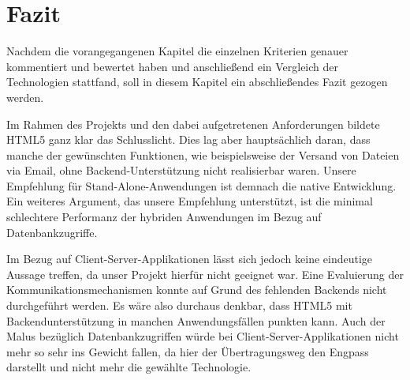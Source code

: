 \section{Fazit}
Nachdem die vorangegangenen Kapitel die einzelnen Kriterien genauer kommentiert und bewertet haben und anschließend ein Vergleich der Technologien stattfand, soll in diesem Kapitel ein abschließendes Fazit gezogen werden.

Im Rahmen des Projekts und den dabei aufgetretenen Anforderungen bildete HTML5 ganz klar das Schlusslicht. Dies lag aber hauptsächlich daran, dass manche der gewünschten Funktionen, wie beispielsweise der Versand von Dateien via Email, ohne Backend-Unterstützung nicht realisierbar waren. Unsere Empfehlung für Stand-Alone-Anwendungen ist demnach die native Entwicklung. Ein weiteres Argument, das unsere Empfehlung unterstützt, ist die minimal schlechtere Performanz der hybriden Anwendungen im Bezug auf Datenbankzugriffe. 

Im Bezug auf Client-Server-Applikationen lässt sich jedoch keine eindeutige Aussage treffen, da unser Projekt hierfür nicht geeignet war. Eine Evaluierung der Kommunikationsmechanismen konnte auf Grund des fehlenden Backends nicht durchgeführt werden. Es wäre also durchaus denkbar, dass HTML5 mit Backendunterstützung in manchen Anwendungsfällen punkten kann. Auch der Malus bezüglich Datenbankzugriffen würde bei Client-Server-Applikationen nicht mehr so sehr ins Gewicht fallen, da hier der Übertragungsweg den Engpass darstellt und nicht mehr die gewählte Technologie.
